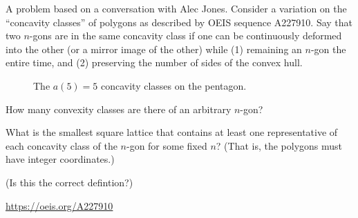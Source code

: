\documentclass{article}
\begin{document}
A problem based on a conversation with Alec Jones. Consider a variation on the
``concavity classes'' of polygons as described by OEIS sequence A227910.
Say that two $n$-gons are in the same concavity class if one can be
continuously deformed into the other (or a mirror image of the other) while
(1) remaining an $n$-gon the entire time, and (2) preserving the number of
sides of the convex hull.
\begin{figure}[ht!]
  \centering
  \hspace{0.5cm}
  \hspace{0.5cm}
  \hspace{0.5cm}
  \hspace{0.5cm}
  \caption{
    The $a(5) = 5$ concavity classes on the pentagon.
  }
\end{figure}
\begin{question}
  How many convexity classes are there of an arbitrary $n$-gon?
\end{question}

\begin{related}
  \item What is the smallest square lattice that contains at least one
    representative of each concavity class of the $n$-gon for some fixed $n$?
    (That is, the polygons must have integer coordinates.)
  \item (Is this the correct defintion?)
\end{related}
\begin{references}
  \item \url{https://oeis.org/A227910}
\end{references}
\end{document}
